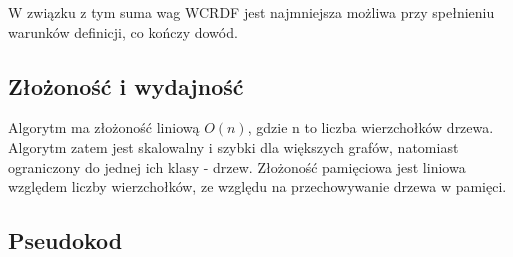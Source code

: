 W związku z tym suma wag WCRDF jest najmniejsza możliwa przy spełnieniu warunków definicji, co kończy dowód.

\subsection{Złożoność i wydajność}
Algorytm ma złożoność liniową $O(n)$, gdzie n to liczba wierzchołków drzewa. Algorytm zatem jest skalowalny i szybki dla większych grafów, natomiast ograniczony do jednej ich klasy - drzew. Złożoność pamięciowa jest liniowa względem liczby wierzchołków, ze względu na przechowywanie drzewa w pamięci.

\subsection{Pseudokod}
